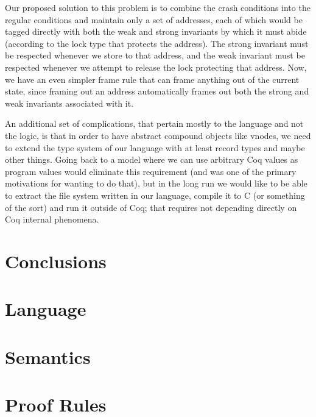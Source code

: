 Our proposed solution to this problem is to combine the crash conditions into
the regular conditions and maintain only a set of addresses, each of which
would be tagged directly with both the weak and strong invariants by which it
must abide (according to the lock type that protects the address).
The strong
invariant must be respected whenever we store
to that address, and the weak invariant must be respected whenever we attempt to
release the lock protecting that address.
Now, we have an even simpler frame
rule that can frame anything out of the current state, since framing out an
address automatically frames out both the strong and weak invariants associated
with it.

%

An additional set of complications, that pertain mostly to the
language and not the logic, is that in order to have abstract compound
objects like vnodes, we need to extend the type system of our language
with at least record types and maybe other things.
Going back to a model where we can use arbitrary Coq values as program
values would eliminate this requirement (and was one of the primary
motivations for wanting to do that), but in the long run we would
like to be able to extract the file system written in our language,
compile it to C (or something of the sort) and run it outside of Coq;
that requires not depending directly on Coq internal phenomena.

\section{Conclusions}
\label{sec:conclusions}


\appendix
\section{Language}
\label{sec:appendix_ast}
\section{Semantics}
\label{sec:appendix_semantics}
\section{Proof Rules}
\label{sec:appendix_logic}
